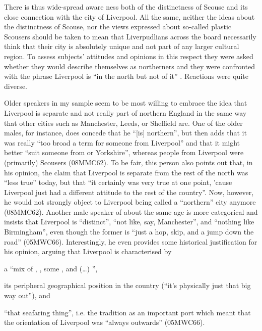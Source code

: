There is thus wide-spread aware ness both of the distinctness of Scouse and its close connection with the city of Liverpool.
All the same, neither the ideas about the distinctness of Scouse, nor the views expressed about so-called plastic Scousers should be taken to mean that Liverpudlians across the board necessarily think that their city is absolutely unique and not part of any larger cultural region.
To assess subjects' attitudes and opinions in this respect they were asked whether they would describe themselves as northerners and they were confronted with the phrase Liverpool is ``in the north but not of it'' \parencite[xxx]{belchem2006b}.
Reactions were quite diverse.

Older speakers in my sample seem to be most willing to embrace the idea that Liverpool is separate and not really part of northern England in the same way that other cities such as Manchester, Leeds, or Sheffield are.
One of the older males, for instance, does concede that he ``[is] northern'', but then adds that it was really ``too broad a term for someone from Liverpool'' and that it might better ``suit someone from  or Yorkshire'', whereas people from Liverpool were (primarily) Scousers (08MMC62).
To be fair, this person also points out that, in his opinion, the claim that Liverpool is separate from the rest of the north was ``less true'' today, but that ``it certainly was very true at one point, 'cause Liverpool just had a different attitude to the rest of the country''.
Now, however, he would not strongly object to Liverpool being called a ``northern'' city anymore (08MMC62).
Another male speaker of about the same age is more categorical and insists that Liverpool is ``distinct'', ``not like, say, Manchester'', and ``nothing like Birmingham'', even though the former is ``just a hop, skip, and a jump down the road'' (05MWC66).
Interestingly, he even provides some historical justification for his opinion, arguing that Liverpool is characterised by
\begin{inparaenum}[(1)]
	\item a ``mix of , , some , and (\ldots) '',
	\item its peripheral geographical position in the country (``it's physically just that big way out''), and
	\item ``that seafaring thing'', i.e. the tradition as an important port which meant that the orientation of Liverpool was ``always outwards'' (05MWC66).
\end{inparaenum}

